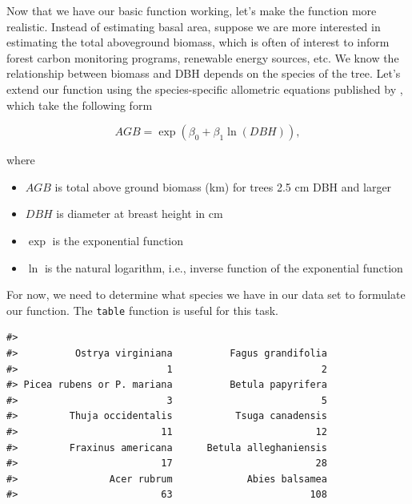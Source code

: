\documentclass[
  11pt,
]{krantz}
\newenvironment{Shaded}{\begin{snugshade}}{\end{snugshade}}
\newcommand{\KeywordTok}[1]{\textcolor[rgb]{0.13,0.29,0.53}{\textbf{#1}}}
\newcommand{\NormalTok}[1]{#1}
\newcommand{\OperatorTok}[1]{\textcolor[rgb]{0.81,0.36,0.00}{\textbf{#1}}}
\providecommand{\tightlist}{%
  \setlength{\itemsep}{0pt}\setlength{\parskip}{0pt}}
\theoremstyle{definition}
\theoremstyle{definition}
\theoremstyle{definition}
\theoremstyle{definition}
\theoremstyle{remark}
\begin{document}
Now that we have our basic function working, let's make the function more realistic. Instead of estimating basal area, suppose we are more interested in estimating the total aboveground biomass, which is often of interest to inform forest carbon monitoring programs, renewable energy sources, etc. We know the relationship between biomass and DBH depends on the species of the tree. Let's extend our function using the species-specific allometric equations published by \citet{jenkins03}, which take the following form

\begin{equation}
  AGB = \exp(\beta_0 + \beta_1 \ln(DBH)),
  \label{eq:jenkBio}
\end{equation}

where

\begin{itemize}
\tightlist
\item
  \(AGB\) is total above ground biomass (km) for trees 2.5 cm DBH and larger
\item
  \(DBH\) is diameter at breast height in cm
\item
  \(\exp\) is the exponential function
\item
  \(\ln\) is the natural logarithm, i.e., inverse function of the exponential function
\end{itemize}

For now, we need to determine what species we have in our data set to formulate our function. The \texttt{table} function is useful for this task.

\begin{Shaded}
\end{Shaded}

\begin{verbatim}
#> 
#>          Ostrya virginiana          Fagus grandifolia 
#>                          1                          2 
#> Picea rubens or P. mariana          Betula papyrifera 
#>                          3                          5 
#>         Thuja occidentalis           Tsuga canadensis 
#>                         11                         12 
#>         Fraxinus americana      Betula alleghaniensis 
#>                         17                         28 
#>                Acer rubrum             Abies balsamea 
#>                         63                        108
\end{verbatim}
\end{document}
